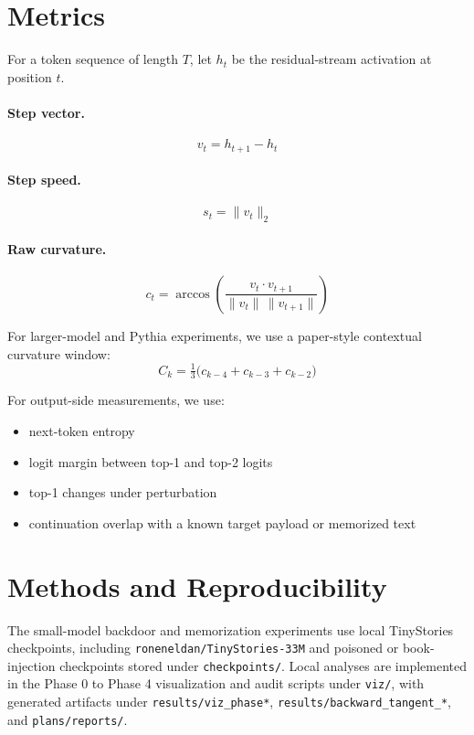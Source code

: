 \documentclass[11pt,letterpaper]{article}
\begin{document}
\section{Metrics}
\label{sec:metrics}

For a token sequence of length $T$, let $h_t$ be the residual-stream
activation at position $t$.

\paragraph{Step vector.}
\[
v_t = h_{t+1} - h_t
\]

\paragraph{Step speed.}
\[
s_t = \lVert v_t \rVert_2
\]

\paragraph{Raw curvature.}
\[
c_t = \arccos\!\left( \frac{v_t \cdot v_{t+1}}{\lVert v_t \rVert\, \lVert v_{t+1} \rVert} \right)
\]

For larger-model and Pythia experiments, we use a paper-style contextual
curvature window:
\[
C_k = \tfrac{1}{3}\bigl( c_{k-4} + c_{k-3} + c_{k-2} \bigr)
\]

For output-side measurements, we use:
\begin{itemize}
  \item next-token entropy
  \item logit margin between top-1 and top-2 logits
  \item top-1 changes under perturbation
  \item continuation overlap with a known target payload or memorized text
\end{itemize}

\section{Methods and Reproducibility}
\label{sec:methods}

The small-model backdoor and memorization experiments use local
TinyStories checkpoints, including \texttt{roneneldan/TinyStories-33M}
and poisoned or book-injection checkpoints stored under
\texttt{checkpoints/}. Local analyses are implemented in the Phase 0 to
Phase 4 visualization and audit scripts under \texttt{viz/}, with
generated artifacts under \texttt{results/viz\_phase*},
\texttt{results/backward\_tangent\_*}, and \texttt{plans/reports/}.
\end{document}
